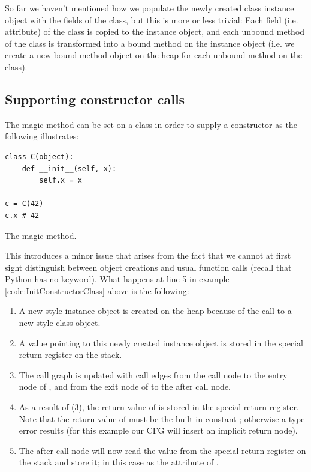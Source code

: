 So far we haven't mentioned how we populate the newly created class instance object with the fields of the class, but this is more or less trivial: Each field (i.e. attribute) of the class is copied to the instance object, and each unbound method of the class is transformed into a bound method on the instance object (i.e. we create a new bound method object on the heap for each unbound method on the class).


\subsection{Supporting constructor calls}
The magic method  can be set on a class in order to supply a constructor as the following illustrates:

\begin{listing}[H]
	\begin{verbatim}
class C(object):
	def __init__(self, x):
		self.x = x

c = C(42)
c.x # 42
	\end{verbatim}
	\caption{The  magic method.}\label{code:InitConstructorClass}
\end{listing}

This introduces a minor issue that arises from the fact that we cannot at first sight distinguish between object creations and usual function calls (recall that Python has no  keyword). What happens at line 5 in example \ref{code:InitConstructorClass} above is the following:

\begin{enumerate}
	\item A new style instance object is created on the heap because of the call to a new style class object.
	\item A value pointing to this newly created instance object is stored in the special return register on the stack.
	\item The call graph is updated with call edges from the call node to the entry node of , and from the exit node of  to the after call node.
	\item As a result of (3), the return value of  is stored in the special return register. Note that the return value of  must be the built in constant ; otherwise a type error results (for this example our CFG will insert an implicit return  node).
	\item The after call node will now read the value from the special return register on the stack and store it; in this case as the attribute  of .
\end{enumerate}

